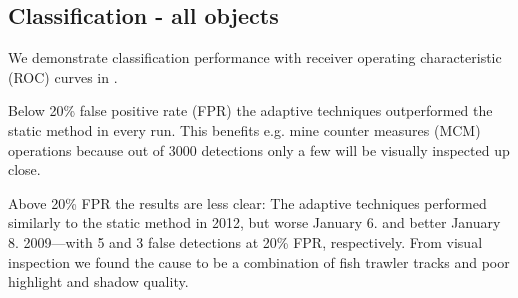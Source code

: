 

\subsection{Classification - all objects}

We demonstrate classification performance with receiver operating characteristic (ROC) curves in . 

Below 20\% false positive rate (FPR) the adaptive techniques outperformed the static method in every run. This benefits e.g. mine counter measures (MCM) operations because out of 3000 detections only a few will be visually inspected up close.

Above 20\% FPR the results are less clear: The adaptive techniques performed similarly to the static method in 2012, but worse January 6. and better January 8. 2009---with 5 and 3 false detections at 20\% FPR, respectively. From visual inspection we found the cause to be a combination of fish trawler tracks and poor highlight and shadow quality.


 
%
%
%
%
%
%





%
%
%
%
%
%
%
%
%


